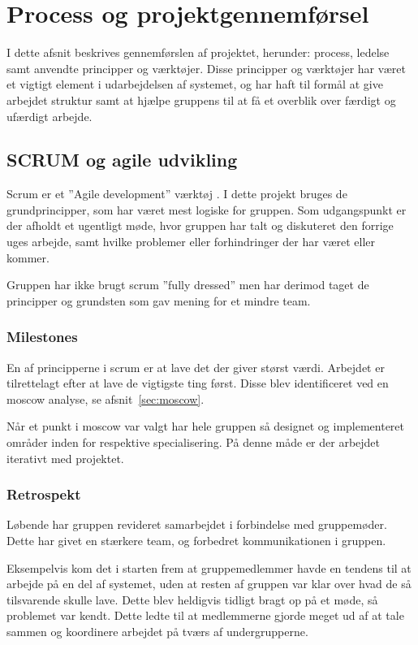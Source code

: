 \chapter{Process og projektgennemførsel}

I dette afsnit beskrives gennemførslen af projektet, herunder: process, ledelse samt anvendte principper og værktøjer. Disse principper og værktøjer har været et vigtigt element i udarbejdelsen af systemet, og har haft til formål at give arbejdet struktur samt at hjælpe gruppens til at få et overblik over færdigt og ufærdigt arbejde.

\section{SCRUM og agile udvikling}
Scrum er et ”Agile development” værktøj . I dette projekt bruges de grundprincipper, som har været mest logiske for gruppen. Som udgangspunkt er der afholdt et ugentligt møde, hvor gruppen har talt og diskuteret den forrige uges arbejde, samt hvilke problemer eller forhindringer der har været eller kommer.

Gruppen har ikke brugt scrum ''fully dressed'' men har derimod taget de principper og grundsten som gav mening for et mindre team.

\subsection{Milestones}
En af principperne i scrum er at lave det der giver størst værdi. Arbejdet er tilrettelagt efter at lave de vigtigste ting først. Disse blev identificeret ved en \gls{moscow} analyse, se afsnit~\ref{sec:moscow}.

Når et punkt i \gls{moscow} var valgt har hele gruppen så designet og implementeret områder inden for respektive specialisering. På denne måde er der arbejdet iterativt med projektet.

\subsection{Retrospekt}
Løbende har gruppen revideret samarbejdet i forbindelse med gruppemøder. Dette har givet en stærkere team, og forbedret kommunikationen i gruppen.

Eksempelvis kom det i starten frem at gruppemedlemmer havde en tendens til at arbejde på en del af systemet, uden at resten af gruppen var klar over hvad de så tilsvarende skulle lave.
Dette blev heldigvis tidligt bragt op på et møde, så problemet var kendt. Dette ledte til at medlemmerne gjorde meget ud af at tale sammen og koordinere arbejdet på tværs af undergrupperne.

